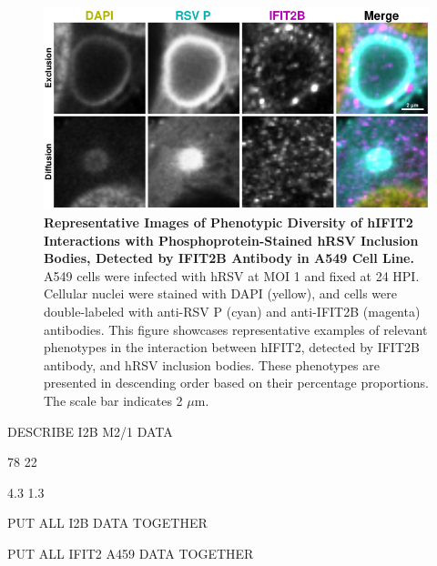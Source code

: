 \begin{figure}
    \centering
    \includegraphics[width=1\linewidth]{08. Chapter 3/Figs/02. Infection/02. IFIT2/02. IFIT2B/06. i2b a549 hrsv p.pdf} 
    \caption[Representative Images of Phenotypic Diversity of hIFIT2 Interactions with Phosphoprotein-Stained hRSV Inclusion Bodies, Detected by IFIT2B Antibody in A549 Cell Line.]{\textbf{Representative Images of Phenotypic Diversity of hIFIT2 Interactions with Phosphoprotein-Stained hRSV Inclusion Bodies, Detected by IFIT2B Antibody in A549 Cell Line.} A549 cells were infected with hRSV at MOI 1 and fixed at 24 HPI. Cellular nuclei were stained with DAPI (yellow), and cells were double-labeled with anti-RSV P (cyan) and anti-IFIT2B (magenta) antibodies. This figure showcases representative examples of relevant phenotypes in the interaction between hIFIT2, detected by IFIT2B antibody, and hRSV inclusion bodies. These phenotypes are presented in descending order based on their percentage proportions. The scale bar indicates 2 \(\mu \mbox{m}\).}
    \label{fig:Representative Images of Phenotypic Diversity of hIFIT2 Interactions with Phosphoprotein-Stained hRSV Inclusion Bodies, Detected by IFIT2B Antibody in A549 Cell Line}
\end{figure}

DESCRIBE I2B M2/1 DATA

78 22

4.3 1.3

PUT ALL I2B DATA TOGETHER

PUT ALL IFIT2 A459 DATA TOGETHER

